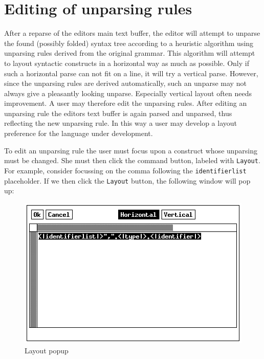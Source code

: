 \section {Editing of unparsing rules}
After a reparse of the editors main text buffer, the editor will
attempt to unparse the found (possibly folded) syntax tree according
to a heuristic algorithm using unparsing rules derived from the
original grammar. This algorithm will attempt to layout syntactic
constructs in a horizontal way as much as possible. Only if such
a horizontal parse can not fit on a line, it will try a vertical parse.
However, since the unparsing rules are derived automatically,
such an unparse may not always give a pleasantly looking unparse.
Especially vertical layout often needs improvement.
A user may therefore edit the unparsing rules. After editing an
unparsing rule the editors text buffer is again parsed and unparsed,
thus reflecting the new unparsing rule. In this way a user may
develop a layout preference for the language under development.

To edit an unparsing rule the user must focus upon a construct whose
unparsing must be changed. She must then click the command button,
labeled with {\tt Layout}. For example, consider focussing on the
comma following the {\tt identifierlist} placeholder. If we then
click the {\tt Layout} button, the following window will pop up:
\begin{figure}[h]
\begin {center}
\includegraphics[bb = 155 300 455 492]{pico3.eps}
\end {center}
\caption {Layout popup}
\end {figure}

